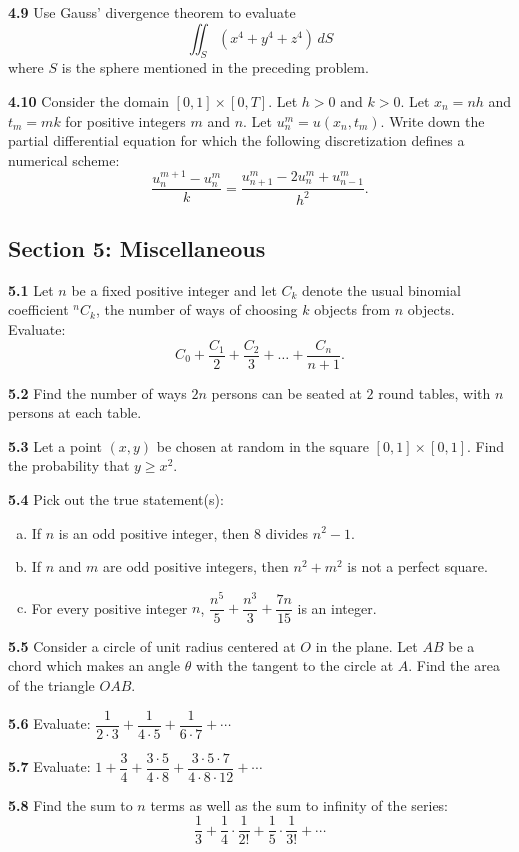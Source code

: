 \documentclass[11pt,a4paper]{article}
\newcommand{\examsec}[1]{%
  \subsection*{#1}
  \vspace{-2pt}
}
\newcommand{\qitem}[1]{\par\medskip\noindent\textbf{#1}\hspace{0.5em}}
\begin{document}
\qitem{4.9} Use Gauss' divergence theorem to evaluate
\[
  \iint_S (x^4 + y^4 + z^4)\,dS
\]
where $S$ is the sphere mentioned in the preceding problem.

\qitem{4.10} Consider the domain $[0, 1] \times [0, T]$. Let $h > 0$ and $k > 0$. Let $x_n = nh$ and $t_m = mk$ for positive integers $m$ and $n$. Let $u_n^m = u(x_n, t_m)$. Write down the partial differential equation for which the following discretization defines a numerical scheme:
\[
  \frac{u_n^{m+1} - u_n^m}{k} = \frac{u_{n+1}^m - 2u_n^m + u_{n-1}^m}{h^2}.
\]

\examsec{Section 5: Miscellaneous}

\qitem{5.1} Let $n$ be a fixed positive integer and let $C_k$ denote the usual binomial coefficient ${}^n C_k$, the number of ways of choosing $k$ objects from $n$ objects. Evaluate:
\[
  C_0 + \frac{C_1}{2} + \frac{C_2}{3} + \dots + \frac{C_n}{n+1}.
\]

\qitem{5.2} Find the number of ways $2n$ persons can be seated at $2$ round tables, with $n$ persons at each table.

\qitem{5.3} Let a point $(x, y)$ be chosen at random in the square $[0, 1] \times [0, 1]$. Find the probability that $y \ge x^2$.

\qitem{5.4} Pick out the true statement(s):
\begin{enumerate}[(a)]
  \item If $n$ is an odd positive integer, then $8$ divides $n^2 - 1$.
  \item If $n$ and $m$ are odd positive integers, then $n^2 + m^2$ is not a perfect square.
  \item For every positive integer $n$, $\dfrac{n^5}{5} + \dfrac{n^3}{3} + \dfrac{7n}{15}$ is an integer.
\end{enumerate}

\qitem{5.5} Consider a circle of unit radius centered at $O$ in the plane. Let $AB$ be a chord which makes an angle $\theta$ with the tangent to the circle at $A$. Find the area of the triangle $OAB$.

\qitem{5.6} Evaluate: $\dfrac{1}{2\cdot 3} + \dfrac{1}{4\cdot 5} + \dfrac{1}{6\cdot 7} + \cdots$

\qitem{5.7} Evaluate: $1 + \dfrac{3}{4} + \dfrac{3\cdot 5}{4\cdot 8} + \dfrac{3\cdot 5\cdot 7}{4\cdot 8\cdot 12} + \cdots$

\qitem{5.8} Find the sum to $n$ terms as well as the sum to infinity of the series:
\[
  \frac{1}{3} + \frac{1}{4}\cdot\frac{1}{2!} + \frac{1}{5}\cdot\frac{1}{3!} + \cdots
\]
\end{document}
